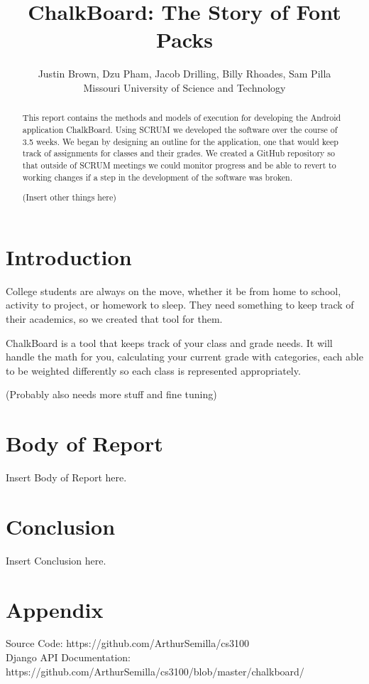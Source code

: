 \documentclass[a4paper]{article} %
\date{} %
\def\titulo#1{\title{#1}} %
\def\autores#1{\author{#1}} %
\begin{document}
\titulo{ChalkBoard: The Story of Font Packs}

\autores{Justin Brown, Dzu Pham, Jacob Drilling, Billy Rhoades, Sam Pilla \\ %
       Missouri University of Science and Technology \\
       }%
\doublespace

\maketitle

\thispagestyle{empty}




\begin{abstract}

This report contains the methods and models of execution for developing the Android application ChalkBoard. Using SCRUM we developed the software over the course of 3.5 weeks. We began by designing an outline for the application, one that would keep track of assignments for classes and their grades. We created a GitHub repository so that outside of SCRUM meetings we could monitor progress and be able to revert to working changes if a step in the development of the software was broken.

(Insert other things here)

\end{abstract}

\section*{Introduction}

College students are always on the move, whether it be from home to school, activity to project, or homework to sleep. They need something to keep track of their academics, so we created that tool for them.

ChalkBoard is a tool that keeps track of your class and grade needs. It will handle the math for you, calculating your current grade with categories, each able to be weighted differently so each class is represented appropriately.

(Probably also needs more stuff and fine tuning)

\section*{Body of Report}

Insert Body of Report here.

\section*{Conclusion}

Insert Conclusion here.


\section*{Appendix}

Source Code: https://github.com/ArthurSemilla/cs3100 \\
\vspace{3mm}
Django API Documentation: https://github.com/ArthurSemilla/cs3100/blob/master/chalkboard/
\end{document}
